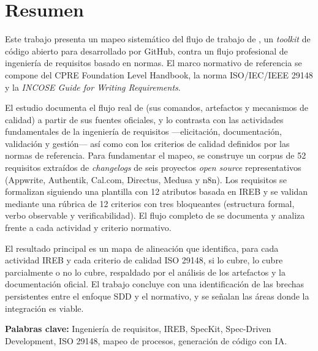 \section*{Resumen}

Este trabajo presenta un mapeo sistem\'atico del flujo de trabajo de \speckit{}, un \emph{toolkit} de c\'odigo abierto para \sdd{} desarrollado por GitHub, contra un flujo profesional de ingenier\'ia de requisitos basado en normas. El marco normativo de referencia se compone del \ireb{} CPRE Foundation Level Handbook, la norma ISO/IEC/IEEE 29148 y la \textit{INCOSE Guide for Writing Requirements}.

El estudio documenta el flujo real de \speckit{} (sus comandos, artefactos y mecanismos de calidad) a partir de sus fuentes oficiales, y lo contrasta con las actividades fundamentales de la ingenier\'ia de requisitos ---elicitaci\'on, documentaci\'on, validaci\'on y gesti\'on--- as\'i como con los criterios de calidad definidos por las normas de referencia. Para fundamentar el mapeo, se construye un corpus de 52 requisitos extra\'idos de \emph{changelogs} de seis proyectos \emph{open source} representativos (Appwrite, Authentik, Cal.com, Directus, Medusa y n8n). Los requisitos se formalizan siguiendo una plantilla con 12 atributos basada en IREB y se validan mediante una r\'ubrica de 12 criterios con tres bloqueantes (estructura formal, verbo observable y verificabilidad). El flujo completo de \speckit{} se documenta y analiza frente a cada actividad y criterio normativo.

El resultado principal es un mapa de alineaci\'on que identifica, para cada actividad IREB y cada criterio de calidad ISO 29148, si \speckit{} lo cubre, lo cubre parcialmente o no lo cubre, respaldado por el an\'alisis de los artefactos y la documentaci\'on oficial. El trabajo concluye con una identificaci\'on de las brechas persistentes entre el enfoque SDD y el normativo, y se se\~nalan las \'areas donde la integraci\'on es viable.

\vspace{0.5cm}
\noindent\textbf{Palabras clave:} Ingenier\'ia de requisitos, IREB, SpecKit, Spec-Driven Development, ISO 29148, mapeo de procesos, generaci\'on de c\'odigo con IA.
